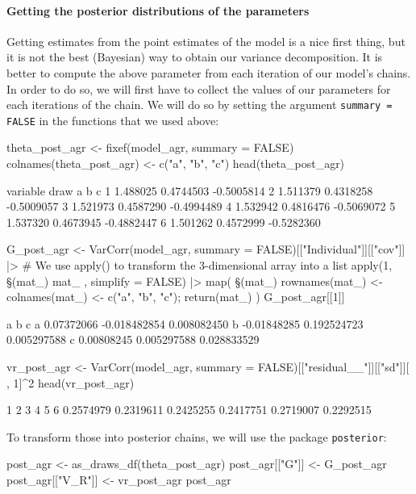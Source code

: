 \documentclass[a4paper,12pt,twoside]{article}
\begin{document}
\paragraph{Getting the posterior distributions of the parameters}
Getting estimates from the point estimates of the model is a nice first thing, but it is not the best (Bayesian) way to obtain our variance decomposition. It is better to compute the above parameter from each iteration of our model's chains.
In order to do so, we will first have to collect the values of our parameters for each iterations of the chain.
We will do so by setting the argument \texttt{summary = FALSE} in the functions that we used above:
\begin{Rinput}
theta_post_agr <- fixef(model_agr, summary = FALSE)
colnames(theta_post_agr) <- c("a", "b", "c")
head(theta_post_agr)
\end{Rinput}
\begin{Routput}
    variable
draw        a         b          c
   1 1.488025 0.4744503 -0.5005814
   2 1.511379 0.4318258 -0.5009057
   3 1.521973 0.4587290 -0.4994489
   4 1.532942 0.4816476 -0.5069072
   5 1.537320 0.4673945 -0.4882447
   6 1.501262 0.4572999 -0.5282360
\end{Routput}
\begin{Rinput}
G_post_agr <-
    VarCorr(model_agr, summary = FALSE)[["Individual"]][["cov"]] |>
    # We use apply() to transform the 3-dimensional array into a list
    apply(1, \§§(mat_) { mat_ }, simplify = FALSE) |>
    map( \§§(mat_) { rownames(mat_) <- colnames(mat_) <- c("a", "b", "c"); return(mat_) })
G_post_agr[[1]]
\end{Rinput}
\begin{Routput}
            a            b           c
a  0.07372066 -0.018482854 0.008082450
b -0.01848285  0.192524723 0.005297588
c  0.00808245  0.005297588 0.028833529
\end{Routput}
\begin{Rinput}
vr_post_agr <-
    VarCorr(model_agr, summary = FALSE)[["residual__"]][["sd"]][ , 1]^2
head(vr_post_agr)
\end{Rinput}
\begin{Routput}
        1         2         3         4         5         6 
0.2574979 0.2319611 0.2425255 0.2417751 0.2719007 0.2292515 
\end{Routput}
To transform those into posterior chains, we will use the package \texttt{posterior}:
\begin{Rinput}
post_agr <- as_draws_df(theta_post_agr)
post_agr[["G"]] <- G_post_agr
post_agr[["V_R"]] <- vr_post_agr
post_agr
\end{Rinput}
\end{document}
